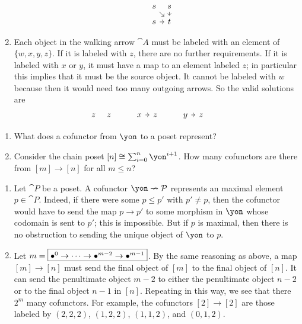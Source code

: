 \documentclass[Book-Poly]{subfiles}
\begin{document}
\begin{exercise}
\begin{solution}
\begin{enumerate}
\[	\quad\;
   \begin{tikzcd}[sep=5pt]
    	s\ar[dr]&s\ar[d]\\
			s\ar[r]&t
    \end{tikzcd}
\]
    \item Each object in the walking arrow $\cat{A}$ must be labeled with an element of $\{w,x,y,z\}$. If it is labeled with $z$, there are no further requirements. If it is labeled with $x$ or $y$, it must have a map to an element labeled $z$; in particular this implies that it must be the source object. It cannot be labeled with $w$ because then it would need too many outgoing arrows. So the valid solutions are
 \[
    \begin{tikzcd}[sep=5pt]
    	z&z
    \end{tikzcd}   
	\qquad\;
    \begin{tikzcd}[sep=5pt]
    	x\ar[r]&z
    \end{tikzcd}   
	\qquad\;	
    \begin{tikzcd}[sep=5pt]
    	y\ar[r]&z
    \end{tikzcd}   
	\qquad\;
\]
\end{enumerate}
\end{solution}
\end{exercise}

\begin{exercise}
\begin{enumerate}
	\item What does a cofunctor from $\yon$ to a poset represent?
	\item Consider the chain poset $[n]\cong\sum_{i=0}^n\yon^{i+1}$.
	How many cofunctors are there from $[m]\to[n]$ for all $m\leq n$?
\qedhere
\end{enumerate}
\begin{solution}
\begin{enumerate}
    \item Let $\cat{P}$ be a poset. A cofunctor $\yon\cof\cat{P}$ represents an maximal element $p\in\cat{P}$. Indeed, if there were some $p\leq p'$ with $p'\neq p$, then the cofunctor would have to send the map $p\to p'$ to some morphism in $\yon$ whose codomain is sent to $p'$; this is impossible. But if $p$ is maximal, then there is no obstruction to sending the unique object of $\yon$ to $p$.
   \item Let $m=\fbox{$\bullet^0\to\cdots\to\bullet^{m-2}\to\bullet^{m-1}$}$. By the same reasoning as above, a map $[m]\to[n]$ must send the final object of $[m]$ to the final object of $[n]$. It can send the penultimate object $m-2$ to either the penultimate object $n-2$ or to the final object $n-1$ in $[n]$. Repeating in this way, we see that there $2^m$ many cofunctors. For example, the cofunctors $[2]\to[2]$ are those labeled by $(2,2,2)$, $(1,2,2)$, $(1,1,2)$, and $(0,1,2)$.
 \end{enumerate}
\end{solution}
\end{exercise}
\end{document}
